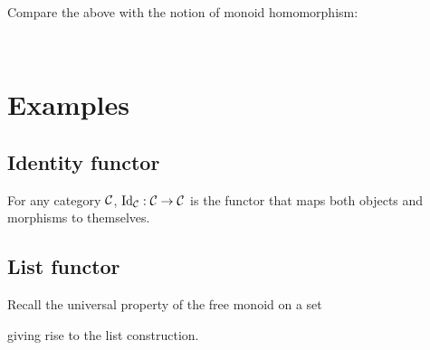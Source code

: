\begin{remark}
Compare the above with the notion of monoid homomorphism:
\begin{center}
\end{center}

\begin{center}
     \\[3mm]
\end{center}
\end{remark}

\section{Examples}

\subsection{Identity functor}

For any category $\mathcal{C}$, $\mathrm{Id}_{\mathcal{C}}: \mathcal{C} \to \mathcal{C}$ is
the functor that maps both objects and morphisms to themselves.

\begin{center}
\end{center}

\subsection{List functor}

Recall the universal property of the free monoid on a set
\begin{center}
\end{center}
giving rise to the list construction.

